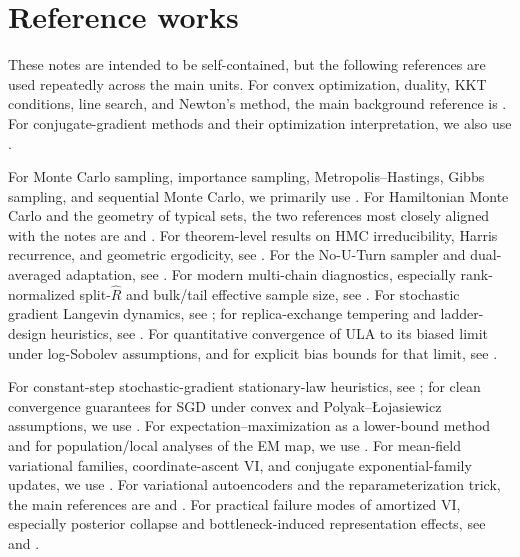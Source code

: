\section*{Reference works}

These notes are intended to be self-contained, but the following references are used repeatedly across the main units.
For convex optimization, duality, KKT conditions, line search, and Newton's method, the main background reference is \citet[Chs.~2--3, 5, and 9--11]{boyd_vandenberghe_2004_convex}.
For conjugate-gradient methods and their optimization interpretation, we also use \citet[Ch.~5]{nocedal_wright_2006_numerical}.

For Monte Carlo sampling, importance sampling, Metropolis--Hastings, Gibbs sampling, and sequential Monte Carlo, we primarily use \citet[Chs.~2, 5--6, and \S\S3.4.3--3.4.4]{liu_2002_monte_carlo}.
For Hamiltonian Monte Carlo and the geometry of typical sets, the two references most closely aligned with the notes are \citet[\S3 and App.~A.1]{betancourt_2017_hmc_conceptual} and \citet[\S\S3.2--4.2]{neal_2011_hmc}.
For theorem-level results on HMC irreducibility, Harris recurrence, and geometric ergodicity, see \citet[Thms.~1--2 and 9]{durmus_moulines_saksman_2019_hmc_convergence}.
For the No-U-Turn sampler and dual-averaged adaptation, see \citet[\S3 and \S3.2]{hoffman_gelman_2014_nuts}.
For modern multi-chain diagnostics, especially rank-normalized split-$\hat R$ and bulk/tail effective sample size, see \citet[\S\S3.2--4.5]{vehtari_gelman_simpson_carpenter_burkner_2021_rank_normalization}.
For stochastic gradient Langevin dynamics, see \citet[\S\S2--3]{welling_teh_2011_sgld}; for replica-exchange tempering and ladder-design heuristics, see \citet[\S\S2.1--2.3]{earl_deem_2005_parallel_tempering}.
For quantitative convergence of ULA to its biased limit under log-Sobolev assumptions, and for explicit bias bounds for that limit, see \citet[Thm.~1 and \S7.1]{vempala_wibisono_2019_ula_isoperimetry}.

For constant-step stochastic-gradient stationary-law heuristics, see \citet[pp.~1--2]{mandt_hoffman_blei_2015_ct_limit_sgd}; for clean convergence guarantees for SGD under convex and Polyak--\L{}ojasiewicz assumptions, we use \citet[Thms.~5.3 and 5.10]{garrigos_gower_2024_handbook}.
For expectation--maximization as a lower-bound method and for population/local analyses of the EM map, we use \citet[\S2.1 and \S3]{balakrishnan_wainwright_yu_2014_em}.
For mean-field variational families, coordinate-ascent VI, and conjugate exponential-family updates, we use \citet[\S\S2.3--2.4 and 4.1--4.2]{blei_kucukelbir_mcauliffe_2017_vi_review}.
For variational autoencoders and the reparameterization trick, the main references are \citet[\S\S2.2--2.4]{kingma_welling_2014_aevb} and \citet[\S\S3--4]{rezende_mohamed_wierstra_2014_stochastic_backpropagation}.
For practical failure modes of amortized VI, especially posterior collapse and bottleneck-induced representation effects, see \citet[\S\S3--4]{he_spokoyny_neubig_bergkirkpatrick_2019_lagging_inference} and \citet[\S\S4.2--5]{burgess_higgins_pal_matthey_watters_desjardins_lerchner_2018_understanding_bvae}.

